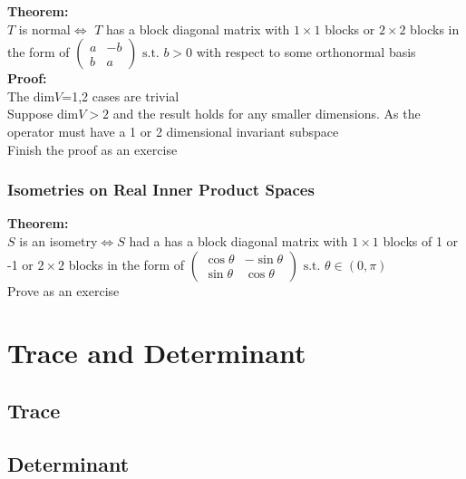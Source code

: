 \documentclass{article}
\newcommand{\st}{\mbox{ s.t. }}
\newcommand{\0}{{\bf{0}}}
\begin{document}
\textbf{Theorem:}\\
$T$ is normal$\iff$
$T$ has a block diagonal matrix with $1\times1$ blocks or $2\times2$ blocks in the form of $\begin{pmatrix}
    a&-b\\
    b&a
\end{pmatrix}\st b>0$ with respect to some orthonormal basis\\
\textbf{Proof:}\\
The dim$V$=1,2 cases are trivial\\
Suppose dim$V>2$ and the result holds for any smaller dimensions. As the operator must have a 1 or 2 dimensional invariant subspace\\
\null\hfill{Finish the proof as an exercise}
\subsubsection{Isometries on Real Inner Product Spaces}
\textbf{Theorem:}\\
$S$ is an isometry$\iff S$ had a has a block diagonal matrix with $1\times1$ blocks of 1 or -1 or $2\times2$ blocks in the form of $\begin{pmatrix}
    \cos\theta&-\sin\theta\\
    \sin\theta&\cos\theta
\end{pmatrix}\st\theta\in(0,\pi)$\\
\null\hfill{Prove as an exercise}
\clearpage
\section{Trace and Determinant}
\subsection{Trace}
\subsection{Determinant}
\end{document}

